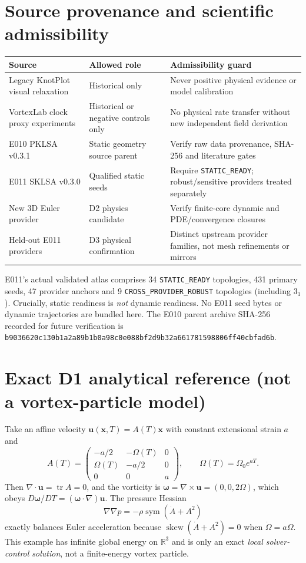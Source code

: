 \documentclass[10pt,a4paper]{article}
\begin{document}
\section{Source provenance and scientific admissibility}
\begin{longtable}{p{.24\linewidth}p{.32\linewidth}p{.37\linewidth}}
\toprule
Source & Allowed role & Admissibility guard\\\midrule
Legacy KnotPlot visual relaxation & Historical only & Never positive physical evidence or model calibration\\
VortexLab clock proxy experiments & Historical or negative controls only & No physical rate transfer without new independent field derivation\\
E010 PKLSA v0.3.1 & Static geometry source parent & Verify raw data provenance, SHA-256 and literature gates\\
E011 SKLSA v0.3.0 & Qualified static seeds & Require \texttt{STATIC\_READY}; robust/sensitive providers treated separately\\
New 3D Euler provider & D2 physics candidate & Verify finite-core dynamic and PDE/convergence closures\\
Held-out E011 providers & D3 physical confirmation & Distinct upstream provider families, not mesh refinements or mirrors\\\bottomrule
\end{longtable}
E011's actual validated atlas comprises 34 \texttt{STATIC\_READY} topologies, 431 primary seeds, 47 provider anchors and 9 \texttt{CROSS\_PROVIDER\_ROBUST} topologies (including $3_1$). Crucially, static readiness is \emph{not} dynamic readiness. No E011 seed bytes or dynamic trajectories are bundled here. The E010 parent archive SHA-256 recorded for future verification is
\texttt{b9036620c130b1a2a89b1b0a98c0e088bf2d9b32a661781598806ff40cbfad6b}.

\section{Exact D1 analytical reference (not a vortex-particle model)}
Take an affine velocity $\mathbf u(\mathbf x,T)=A(T)\mathbf x$ with constant extensional strain $a$ and
\begin{equation}
A(T)=\begin{pmatrix}-a/2&-\Omega(T)&0\\\Omega(T)&-a/2&0\\0&0&a\end{pmatrix},\qquad
\Omega(T)=\Omega_0 e^{aT}.
\label{eq:affine}
\end{equation}
Then $\nabla\cdot\mathbf u=\operatorname{tr}A=0$, and the vorticity is $\bm\omega=\nabla\times\mathbf u=(0,0,2\Omega)$, which obeys $D\bm\omega/DT=(\bm\omega\cdot\nabla)\mathbf u$. The pressure Hessian
\begin{equation}
\nabla\nabla p=-\rho\operatorname{sym}(\dot A+A^2)
\label{eq:pressure}
\end{equation}
exactly balances Euler acceleration because $\operatorname{skew}(\dot A+A^2)=0$ when $\dot\Omega=a\Omega$. This example has infinite global energy on $\mathbb R^3$ and is only an exact \emph{local solver-control solution}, not a finite-energy vortex particle.
\end{document}
